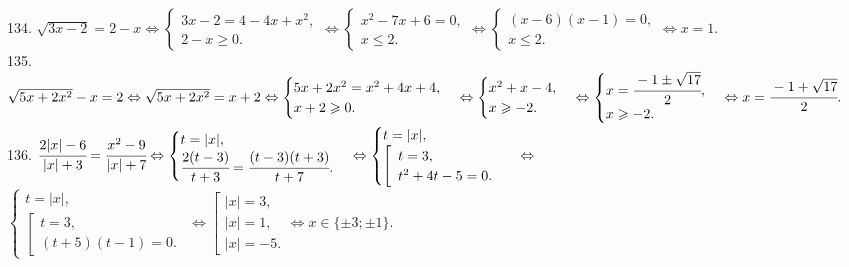 \documentclass[12pt]{article}
\begin{document}
134. $\sqrt{3x-2}=2-x\Leftrightarrow\begin{cases} 3x-2=4-4x+x^2,\\2-x\geqslant0.\end{cases}\Leftrightarrow
\begin{cases} x^2-7x+6=0,\\x\leqslant2.\end{cases}\Leftrightarrow\begin{cases} (x-6)(x-1)=0,\\x\leqslant2.\end{cases}
\Leftrightarrow x=1.$\\
135. $\sqrt{5x+2x^2}-x=2\Leftrightarrow\sqrt{5x+2x^2}=x+2\Leftrightarrow\begin{cases}5x+2x^2=x^2+4x+4,\\ x+2\geqslant0.\end{cases}
\Leftrightarrow\begin{cases}x^2+x-4,\\ x\geqslant-2.\end{cases}
\Leftrightarrow\begin{cases}x=\cfrac{-1\pm\sqrt{17}}{2},\\ x\geqslant-2.\end{cases}
\Leftrightarrow x=\cfrac{-1+\sqrt{17}}{2}.$\\
136. $\cfrac{2|x|-6}{|x|+3}=\cfrac{x^2-9}{|x|+7}\Leftrightarrow \begin{cases} t=|x|,\\ \cfrac{2(t-3)}{t+3}=\cfrac{(t-3)(t+3)}{t+7}. \end{cases}\Leftrightarrow
\begin{cases} t=|x|,\\ \left[\begin{array}{l} t=3,\\ t^2+4t-5=0.\end{array}\right. \end{cases}\Leftrightarrow$\\$
\begin{cases} t=|x|,\\ \left[\begin{array}{l} t=3,\\ (t+5)(t-1)=0.\end{array}\right. \end{cases}\Leftrightarrow
\left[\begin{array}{l} |x|=3,\\ |x|=1,\\ |x|=-5.\end{array}\right.\Leftrightarrow x\in\{\pm 3; \pm1\}.$\\
\end{document}

